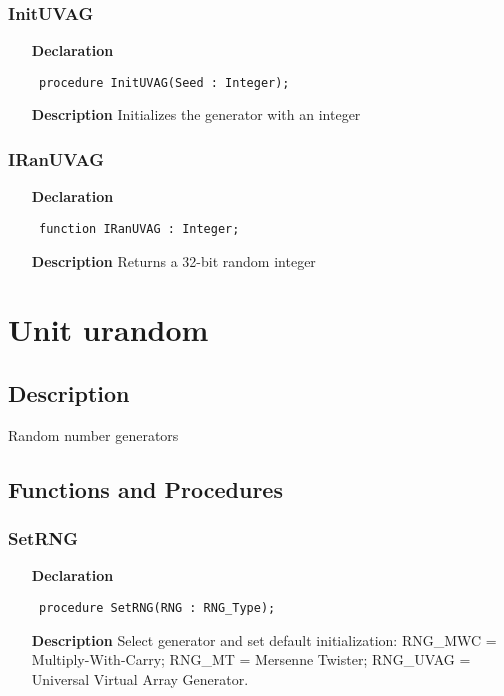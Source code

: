 \documentclass[12pt,a4paper,oneside]{report}
\newcommand{\declarationitem}[1]{\textbf{#1}}
\newcommand{\descriptiontitle}[1]{\textbf{#1}}
\newcommand{\code}[1]{\texttt{#1}}
\begin{document}
\subsubsection{InitUVAG}
\label{uranuvag-InitUVAG}
\begin{itemize}\item[\declarationitem{Declaration}\hfill]
	\begin{flushleft}
		\code{
			procedure InitUVAG(Seed : Integer);}
		
	\end{flushleft}
	
	\par
	\item[\descriptiontitle{Description}]
	Initializes the generator with an integer
	
\end{itemize}
\subsubsection{IRanUVAG}
\label{uranuvag-IRanUVAG}
\begin{itemize}\item[\declarationitem{Declaration}\hfill]
	\begin{flushleft}
		\code{
			function IRanUVAG : Integer;}
		
	\end{flushleft}
	
	\par
	\item[\descriptiontitle{Description}]
	Returns a 32{-}bit random integer
	
\end{itemize}
\section{Unit urandom}
\label{urandom}
\subsection{Description}
Random number generators 
\subsection{Functions and Procedures}
\subsubsection{SetRNG}
\label{urandom-SetRNG}
\begin{itemize}\item[\declarationitem{Declaration}\hfill]
	\begin{flushleft}
		\code{
			procedure SetRNG(RNG : RNG{\_}Type);}
	\end{flushleft}
	\item[\descriptiontitle{Description}]
	Select generator and set default initialization: RNG{\_}MWC = Multiply{-}With{-}Carry; RNG{\_}MT = Mersenne Twister; RNG{\_}UVAG = Universal Virtual Array Generator.
\end{itemize}
\end{document}
